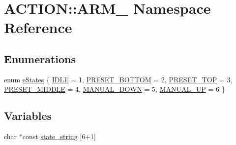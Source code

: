 \hypertarget{namespace_a_c_t_i_o_n_1_1_a_r_m__}{
\section{\-A\-C\-T\-I\-O\-N\-:\-:\-A\-R\-M\-\_\- \-Namespace \-Reference}
\label{namespace_a_c_t_i_o_n_1_1_a_r_m__}
}
\subsection*{\-Enumerations}
\begin{DoxyCompactItemize}
\item 
enum \hyperlink{namespace_a_c_t_i_o_n_1_1_a_r_m___a2fd91530b3ff02a6b32fe5361828f9ab}{e\-States} \{ \*
\hyperlink{namespace_a_c_t_i_o_n_1_1_a_r_m___a2fd91530b3ff02a6b32fe5361828f9abaf55041adab55bcde037b28b157df4621}{\-I\-D\-L\-E} =  1, 
\hyperlink{namespace_a_c_t_i_o_n_1_1_a_r_m___a2fd91530b3ff02a6b32fe5361828f9aba90d297c32362397e81df5c4e9548323c}{\-P\-R\-E\-S\-E\-T\-\_\-\-B\-O\-T\-T\-O\-M} =  2, 
\hyperlink{namespace_a_c_t_i_o_n_1_1_a_r_m___a2fd91530b3ff02a6b32fe5361828f9aba1ac2c10eba02714c9b4e01224149da88}{\-P\-R\-E\-S\-E\-T\-\_\-\-T\-O\-P} =  3, 
\hyperlink{namespace_a_c_t_i_o_n_1_1_a_r_m___a2fd91530b3ff02a6b32fe5361828f9aba80f4b7194c77cfa08a88885643d7980a}{\-P\-R\-E\-S\-E\-T\-\_\-\-M\-I\-D\-D\-L\-E} =  4, 
\*
\hyperlink{namespace_a_c_t_i_o_n_1_1_a_r_m___a2fd91530b3ff02a6b32fe5361828f9abae243fc401eb4464b1bf8b7a5a0c84a8b}{\-M\-A\-N\-U\-A\-L\-\_\-\-D\-O\-W\-N} =  5, 
\hyperlink{namespace_a_c_t_i_o_n_1_1_a_r_m___a2fd91530b3ff02a6b32fe5361828f9abaffa3f4c062cf2f47578a2afb556bd9ae}{\-M\-A\-N\-U\-A\-L\-\_\-\-U\-P} =  6
 \}
\end{DoxyCompactItemize}
\subsection*{\-Variables}
\begin{DoxyCompactItemize}
\item 
char $\ast$const \hyperlink{namespace_a_c_t_i_o_n_1_1_a_r_m___a1766b2978b692ab20690c8a580dc62c8}{state\-\_\-string} \mbox{[}6+1\mbox{]}
\end{DoxyCompactItemize}


